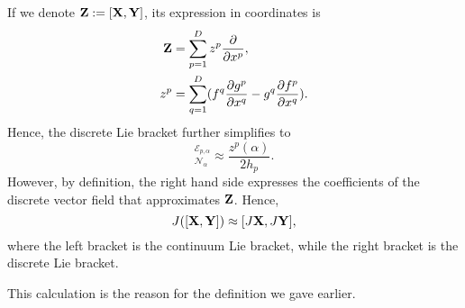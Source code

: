 \begin{discussion}
\begin{equation}
  \end{equation}
  If we denote ${\bf Z} := [{\bf X}, {\bf Y}]$, its expression in coordinates is
  \begin{align}
    {\bf Z} & = \sum_{p = 1}^D z^p \frac{\partial}{\partial x^p}, \\
    z^p & = \sum_{q = 1}^D ( f^q \frac{\partial g^p}{\partial x^q}
                             - g^q \frac{\partial f^p}{\partial x^q}).
  \end{align}
  Hence, the discrete Lie bracket further simplifies to
  \begin{equation}
    [X, Y]^{\mathcal{E}_{p, \alpha}}_{\mathcal{N}_{\alpha}}
    \approx
    \frac{z^p(\alpha)}{2 h_p}.
  \end{equation}
  However, by definition, the right hand side expresses the coefficients of the
  discrete vector field that approximates ${\bf Z}$.
  Hence,
  \begin{equation}
    J([{\bf X}, {\bf Y}]) \approx [J {\bf X}, J {\bf Y}],
  \end{equation}
  where the left bracket is the continuum Lie bracket,
  while the right bracket is the discrete Lie bracket.

  This calculation is the reason for the definition we gave earlier.
\end{discussion}

